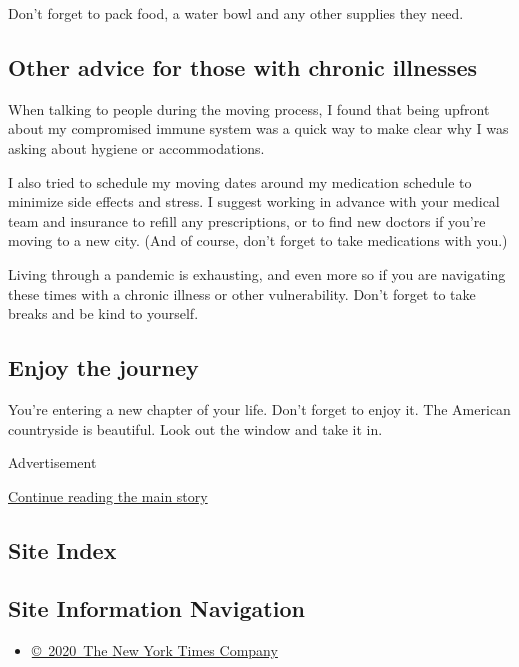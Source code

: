 Don't forget to pack food, a water bowl and any other supplies they
need.

\hypertarget{other-advice-for-those-with-chronic-illnesses}{%
\subsection{Other advice for those with chronic
illnesses}\label{other-advice-for-those-with-chronic-illnesses}}

When talking to people during the moving process, I found that being
upfront about my compromised immune system was a quick way to make clear
why I was asking about hygiene or accommodations.

I also tried to schedule my moving dates around my medication schedule
to minimize side effects and stress. I suggest working in advance with
your medical team and insurance to refill any prescriptions, or to find
new doctors if you're moving to a new city. (And of course, don't forget
to take medications with you.)

Living through a pandemic is exhausting, and even more so if you are
navigating these times with a chronic illness or other vulnerability.
Don't forget to take breaks and be kind to yourself.

\hypertarget{enjoy-the-journey}{%
\subsection{Enjoy the journey}\label{enjoy-the-journey}}

You're entering a new chapter of your life. Don't forget to enjoy it.
The American countryside is beautiful. Look out the window and take it
in.

Advertisement

\protect\hyperlink{after-bottom}{Continue reading the main story}

\hypertarget{site-index}{%
\subsection{Site Index}\label{site-index}}

\hypertarget{site-information-navigation}{%
\subsection{Site Information
Navigation}\label{site-information-navigation}}

\begin{itemize}
\tightlist
\item
  \href{https://help.nytimes3xbfgragh.onion/hc/en-us/articles/115014792127-Copyright-notice}{©~2020~The
  New York Times Company}
\end{itemize}


